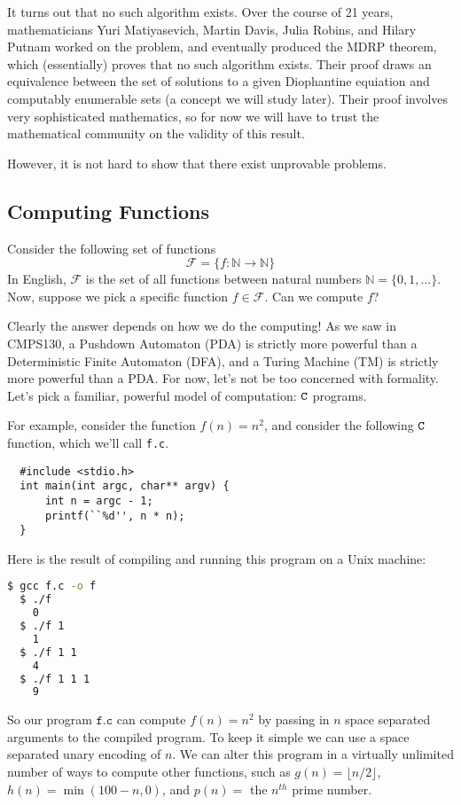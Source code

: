 \documentclass[english, 12pt]{article}
\begin{document}
  It turns out that no such algorithm exists. Over the course of 21 years,
  mathematicians Yuri Matiyasevich, Martin Davis, Julia Robins, and Hilary
  Putnam worked on the problem, and eventually produced the MDRP theorem,
  which (essentially) proves that no such algorithm exists. Their proof 
  draws an equivalence between the set of solutions to a given Diophantine
  equiation and computably enumerable sets (a concept we will study later).
  Their proof involves very sophisticated mathematics, so for now we will
  have to trust the mathematical community on the validity of this result.
  \n

  However, it is not hard to show that there exist unprovable problems.
  \subsection{Computing Functions}
  Consider the following set of functions
  \[ \mathcal{F} = \{ f : \mathbb{N} \rightarrow \mathbb{N} \} \]
  In English, $\mathcal{F}$ is the set of all functions between natural
  numbers \(\mathbb{N} = \{0, 1, \dots \} \).
  Now, suppose we pick a specific function $f \in \mathcal{F}$. Can we
  compute $f$? \n

  Clearly the answer depends on how we do the computing! As we saw in
  CMPS130, a Pushdown Automaton (PDA) is strictly more powerful than a
  Deterministic Finite Automaton (DFA), and a Turing Machine (TM) is
  strictly more powerful than a PDA. For now, let's not be too concerned
  with formality. Let's pick a familiar, powerful model of computation:
  ${\texttt{C}}$ programs. \n

  For example, consider the function \(f(n) = n^2\), and consider the 
  following ${\texttt{C}}$ function, which we'll call \texttt{f.c}.
  \begin{lstlisting}
  #include <stdio.h>
  int main(int argc, char** argv) {
      int n = argc - 1;
      printf(``%d'', n * n);
  }
  \end{lstlisting}
  Here is the result of compiling and running this program on a Unix machine:
  \begin{lstlisting}[language=bash]
  $ gcc f.c -o f
  $ ./f
    0
  $ ./f 1
    1
  $ ./f 1 1
    4
  $ ./f 1 1 1
    9
  \end{lstlisting}
  So our program $\texttt{f.c}$ can compute $f(n) = n^2$ by passing in 
  $n$ space separated arguments to the compiled program. To keep it simple we
  can use a space separated unary encoding of $n$. We can alter this program
  in a virtually unlimited number of ways to compute other functions, such
  as $g(n) = \lfloor n/2 \rfloor$, $h(n) = \min(100 - n, 0)$, and 
  $p(n) = $ the $n^{th}$ prime number.\n
\end{document}
